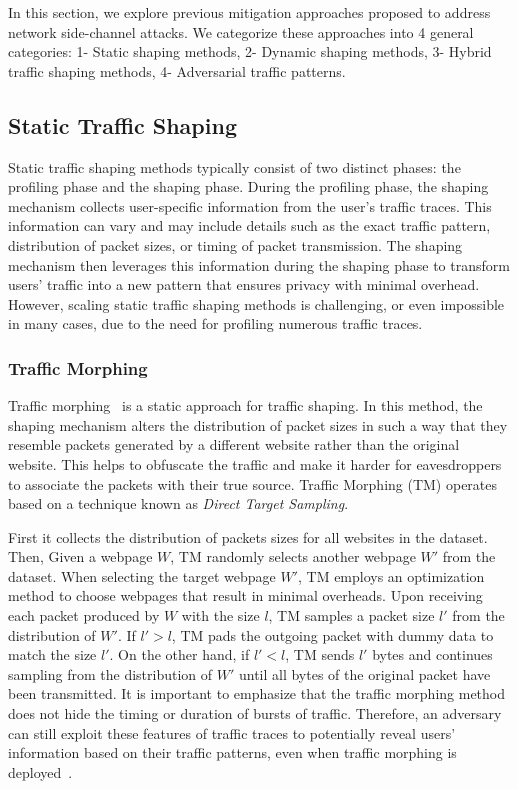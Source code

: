 In this section, we explore previous mitigation approaches proposed to address network side-channel attacks. 
We categorize these approaches into 4 general categories: 1- Static shaping methods, 2- Dynamic shaping methods, 3- Hybrid traffic shaping methods, 4- Adversarial traffic patterns. 

\subsection{Static Traffic Shaping}\label{subsec:static-traffic-shaping}
Static traffic shaping methods typically consist of two distinct phases: the profiling phase and the shaping phase.
During the profiling phase, the shaping mechanism collects user-specific information from the user's traffic traces.
This information can vary and may include details such as the exact traffic pattern, distribution of packet sizes, or timing of packet transmission.
The shaping mechanism then leverages this information during the shaping phase to transform users' traffic into a new pattern that ensures privacy with minimal overhead.
However, scaling static traffic shaping methods is challenging, or even impossible in many cases, due to the need for profiling numerous traffic traces.
\subsubsection{Traffic Morphing}\label{subsubsec:traffic-morphing}
Traffic morphing~\cite{wright2009traffic} is a static approach for traffic shaping. 
In this method, the shaping mechanism alters the distribution of packet sizes in such a way that they resemble packets generated by a different website rather than the original website.
This helps to obfuscate the traffic and make it harder for eavesdroppers to associate the packets with their true source.
Traffic Morphing (TM) operates based on a technique known as \textit{Direct Target Sampling}.

First it collects the distribution of packets sizes for all websites in the dataset.
Then, Given a webpage $W$, TM randomly selects another webpage $W'$ from the dataset.
When selecting the target webpage $W'$, TM employs an optimization method to choose webpages that result in minimal overheads. 
Upon receiving each packet produced by $W$ with the size $l$, TM samples a packet size $l'$ from the distribution of $W'$. 
If $l' > l$, TM pads the outgoing packet with dummy data to match the size $l'$. 
On the other hand, if $l' < l$, TM sends $l'$ bytes and continues sampling from the distribution of $W'$ until all bytes of the original packet have been transmitted.
It is important to emphasize that the traffic morphing method does not hide the timing or duration of bursts of traffic.
Therefore, an adversary can still exploit these features of traffic traces to potentially reveal users' information based on their traffic patterns, even when traffic morphing is deployed~\cite{dyer2012peek}.




